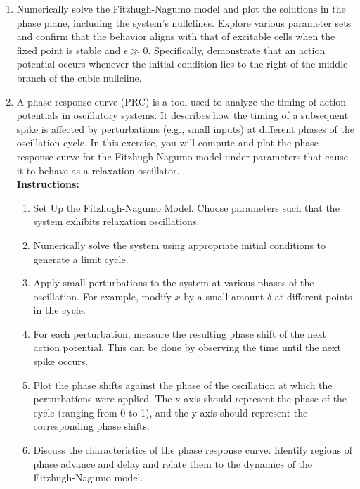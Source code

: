 \begin{enumerate}
    \item Numerically solve the Fitzhugh-Nagumo model and plot the solutions in the phase plane, including the system's nullclines. Explore various parameter sets and confirm that the behavior aligns with that of excitable cells when the fixed point is stable and $\epsilon \gg 0$. Specifically, demonstrate that an action potential occurs whenever the initial condition lies to the right of the middle branch of the cubic nullcline.
  
    \item A phase response curve (PRC) is a tool used to analyze the timing of action potentials in oscillatory systems. It describes how the timing of a subsequent spike is affected by perturbations (e.g., small inputs) at different phases of the oscillation cycle. In this exercise, you will compute and plot the phase response curve for the Fitzhugh-Nagumo model under parameters that cause it to behave as a relaxation oscillator.\\
  \textbf{Instructions:}
  
    \begin{enumerate}
      \item Set Up the Fitzhugh-Nagumo Model. Choose parameters such that the system exhibits relaxation oscillations.
  
      \item Numerically solve the system using appropriate initial conditions to generate a limit cycle.
  
      \item Apply small perturbations to the system at various phases of the oscillation. For example, modify $x$ by a small amount $\delta$ at different points in the cycle.
  
      \item For each perturbation, measure the resulting phase shift of the next action potential. This can be done by observing the time until the next spike occurs.
  
      \item Plot the phase shifts against the phase of the oscillation at which the perturbations were applied. The x-axis should represent the phase of the cycle (ranging from 0 to 1), and the y-axis should represent the corresponding phase shifts.
  
      \item Discuss the characteristics of the phase response curve. Identify regions of phase advance and delay and relate them to the dynamics of the Fitzhugh-Nagumo model.
  
    \end{enumerate}
  \end{enumerate}
  